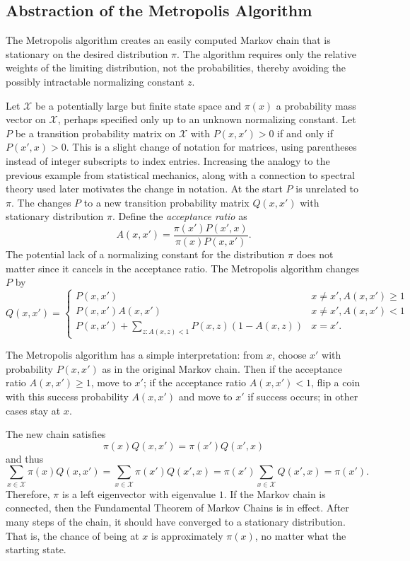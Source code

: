 \documentclass[12pt]{article}
\begin{document}
\subsection*{Abstraction of the Metropolis Algorithm}

The Metropolis algorithm%
creates an easily computed Markov chain that is stationary on the
desired distribution \( \pi \).  The algorithm requires only the
relative weights of the limiting distribution, not the probabilities,
thereby avoiding the possibly intractable normalizing constant \( z \).

Let \( \mathcal{X} \) be a potentially large but finite state space and \(
\pi(x) \) a probability mass vector on \( \mathcal{X} \), perhaps
specified only up to an unknown normalizing constant.  Let \( P \) be a
transition probability matrix on \( \mathcal{X} \) with \( P(x,x') > 0 \)
if and only if \( P(x',x) > 0 \).  This is a slight change of notation
for matrices, using parentheses instead of integer subscripts to index
entries.  Increasing the analogy to the previous example from
statistical mechanics, along with a connection to spectral theory used
later motivates the change in notation.  At the start \( P \) is
unrelated to \( \pi \).  The  changes \( P \)
to a new transition probability matrix \( Q(x,x') \) with stationary
distribution \( \pi \).  Define the \emph{acceptance ratio} as
\[
    A(x,x') = \frac{\pi(x') P(x',x)}{\pi(x) P(x,x')}.
\] The potential lack of a normalizing constant for the distribution \(
\pi \) does not matter since it cancels in the acceptance ratio.  The
Metropolis algorithm changes \( P \) by
\[
    Q(x,x') =
    \begin{cases}
        P(x,x') & x \ne x', A(x,x') \ge 1  \\
        P(x,x')A(x,x') & x \ne x', A(x,x') < 1\ \\
        P(x,x') + \sum\limits_{z:A(x,z) < 1} P(x,z)(1 - A(x,z)) & x = x'.
    \end{cases}
\]

The Metropolis algorithm has a simple interpretation:  from \( x \),
choose \( x' \) with probability \( P(x,x') \) as in the original Markov
chain.  Then if the acceptance ratio \( A(x,x') \ge 1 \), move to \( x' \);
if the acceptance ratio \( A(x,x') < 1 \), flip a coin with this success
probability \( A(x,x') \) and move to \( x' \) if success occurs; in
other cases stay at \( x \).

The new chain satisfies
\[
    \pi(x) Q(x,x') = \pi(x') Q(x',x)
\] and thus
\[
    \sum\limits_{x \in \mathcal{X}} \pi(x) Q(x,x') = \sum\limits_{x \in
    \mathcal{X}} \pi(x') Q(x',x) = \pi(x') \sum\limits_{x \in \mathcal{X}}
    Q(x',x) = \pi(x').
\] Therefore, \( \pi \) is a left eigenvector with eigenvalue \( 1 \).
If the Markov chain is connected, then the Fundamental Theorem of Markov
Chains is in effect.  After many steps of the chain, it should have
converged to a stationary distribution.  That is, the chance of being at
\( x \) is approximately \( \pi(x) \), no matter what the starting
state.
\end{document}
